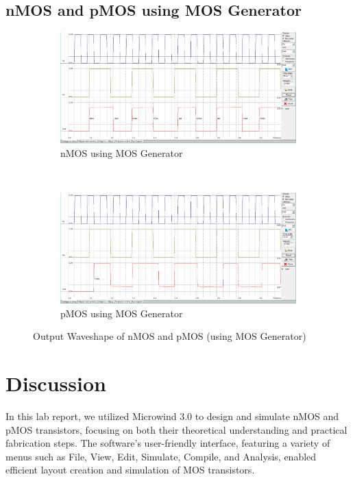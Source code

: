 \documentclass[a4paper,12pt]{article}
\begin{document}
	\subsection{nMOS and pMOS using MOS Generator}
	\begin{figure}[H]
		\centering
		\begin{subfigure}[t]{1\textwidth}
			\centering
			\includegraphics[width=1\linewidth]{Images/Builtin nmos/nsim2.png}
			\caption{nMOS using MOS Generator}
			\label{fig:enter-label}
		\end{subfigure}
		\\[1cm]
		\begin{subfigure}[t]{1\textwidth}
			\centering
			\includegraphics[width=1\linewidth]{Images/Builtin pmos/psim2.png}
			\caption{pMOS using MOS Generator}
			\label{fig:enter-label}
		\end{subfigure}
		\caption{Output Waveshape of nMOS and pMOS (using MOS Generator)}
	\end{figure}
	\newpage
	\section{Discussion }
	In this lab report, we utilized Microwind 3.0 to design and simulate nMOS and pMOS transistors, focusing on both their theoretical understanding and practical fabrication steps. The software's user-friendly interface, featuring a variety of menus such as File, View, Edit, Simulate, Compile, and Analysis, enabled efficient layout creation and simulation of MOS transistors.\\
	
\end{document}
